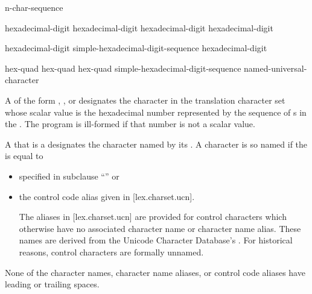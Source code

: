 \documentclass{wg21}
\newcommand{\replaceucs}{\changed{UCS}{Unicode}}
\begin{document}
\begin{bnf}
    \br
     n-char-sequence \terminal{\}}
\end{bnf}

\begin{bnf}
    \br
    hexadecimal-digit hexadecimal-digit hexadecimal-digit hexadecimal-digit
\end{bnf}

\begin{bnf}
    \br
    hexadecimal-digit\br
    simple-hexadecimal-digit-sequence hexadecimal-digit
\end{bnf}

\begin{bnf}
    \br
     hex-quad\br
     hex-quad hex-quad\br
     simple-hexadecimal-digit-sequence \terminal{\}}\br
    named-universal-character
\end{bnf}

\pnum
A 
of the form  ,
  , or
designates the character in the translation character set
whose \replaceucs{} scalar value is the hexadecimal number represented by
the sequence of s
in the .
The program is ill-formed if that number is not a \replaceucs{} scalar value.

\pnum
A 
that is a 
designates the character named by its .
A character is so named if the  is equal to
\begin{itemize}
    \item
    specified in  subclause ``''
    or
    \item
    the control code alias given in [lex.charset.ucn].
    \begin{note}
        The aliases in [lex.charset.ucn] are provided for control characters
        which otherwise have no associated character name or character name alias.
        These names are derived from
        the Unicode Character Database's .
        For historical reasons, control characters are formally unnamed.
    \end{note}
\end{itemize}
\begin{note}
    None of the  character names,
     character name aliases, or
    control code aliases
    have leading or trailing spaces.
\end{note}
\end{document}
